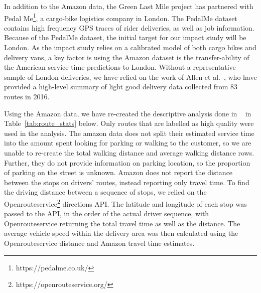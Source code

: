 \documentclass[12pt]{article}
\theoremstyle{plain}
\numberwithin{equation}{section}
\newcommand{\etal}{et al.}
\begin{document}
In addition to the Amazon data, the Green Last Mile project has partnered with Pedal Me\footnote{https://pedalme.co.uk/}, a cargo-bike logistics company in London. The PedalMe dataset contains high frequency GPS traces of rider deliveries, as well as job information. Because of the PedalMe dataset, the initial target for our impact study will be London. As the impact study relies on a calibrated model of both cargo bikes and delivery vans, a key factor is using the Amazon dataset is the transfer-ability of the American service time predictions to London. Without a representative sample of London deliveries, we have relied on the work of Allen \etal~\cite{london_ftc2050}, who have provided a high-level summary of light good delivery data collected from 83 routes in 2016. 

Using the Amazon data, we have re-created the descriptive analysis done in ~\cite{london_ftc2050} in Table~\ref{tab:route_stats} below. Only routes that are labelled as high quality were used in the analysis. The amazon data does not split their estimated service time into the amount spent looking for parking or walking to the customer, so we are unable to re-create the total walking distance and average walking distance rows. Further, they do not provide information on parking location, so the proportion of parking on the street is unknown. Amazon does not report the distance between the stops on drivers' routes, instead reporting only travel time. To find the driving distance between a sequence of stops, we relied on the Openrouteservice\footnote{https://openrouteservice.org/} directions API. The latitude and longitude of each stop was passed to the API, in the order of the actual driver sequence, with Openrouteservice returning the total travel time as well as the distance. The average vehicle speed within the delivery area was then calculated using the Openrouteservice distance and Amazon travel time estimates.
\end{document}
